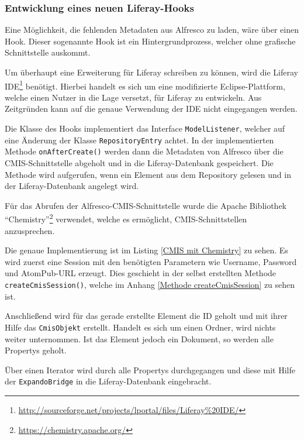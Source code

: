 \subsubsection{Entwicklung eines neuen Liferay-Hooks}\label{Liferay Hook}
Eine M\"oglichkeit, die fehlenden Metadaten aus Alfresco zu laden, w\"are \"uber einen Hook. Dieser sogenannte Hook ist ein Hintergrundprozess, welcher ohne grafische Schnittstelle auskommt. \cite{Liferay_in_Action}

Um \"uberhaupt eine Erweiterung f\"ur Liferay schreiben zu k\"onnen, wird die Liferay IDE\footnote{\url{http://sourceforge.net/projects/lportal/files/Liferay\%20IDE/}} ben\"otigt. Hierbei handelt es sich um eine modifizierte Eclipse-Plattform, welche einen Nutzer in die Lage versetzt, f\"ur Liferay zu entwickeln.
Aus Zeitgr\"unden kann auf die genaue Verwendung der IDE nicht eingegangen werden. 

Die Klasse des Hooks implementiert das Interface \texttt{ModelListener}, welcher auf eine \"Anderung der Klasse \texttt{RepositoryEntry} achtet.
In der implementierten Methode \texttt{onAfterCreate()} werden dann die Metadaten von Alfresco \"uber die \ac{CMIS}-Schnittstelle abgeholt und in die Liferay-Datenbank gespeichert. Die Methode wird aufgerufen, wenn ein Element aus dem Repository gelesen und in der Liferay-Datenbank angelegt wird.

F\"ur das Abrufen der Alfresco-\ac{CMIS}-Schnittstelle wurde die Apache Bibliothek "`Chemistry"'\footnote{\url{https://chemistry.apache.org/}} verwendet, welche es erm\"oglicht, \ac{CMIS}-Schnittstellen anzusprechen.

Die genaue Implementierung ist im Listing \ref{CMIS mit Chemistry} zu sehen. Es wird zuerst eine Session mit den ben\"otigten Parametern wie Username, Password und AtomPub-URL erzeugt. Dies geschieht in der selbst erstellten Methode \texttt{createCmisSession()}, welche im Anhang \ref{Methode createCmisSession} zu sehen ist.

Anschlie\ss{}end wird f\"ur das gerade erstellte Element die ID geholt und mit ihrer Hilfe das \texttt{CmisObjekt} erstellt.
Handelt es sich um einen Ordner, wird nichts weiter unternommen. Ist das Element jedoch ein Dokument, so werden alle Propertys geholt.

\"Uber einen Iterator wird durch alle Propertys durchgegangen und diese mit Hilfe der \texttt{ExpandoBridge} in die Liferay-Datenbank eingebracht.



